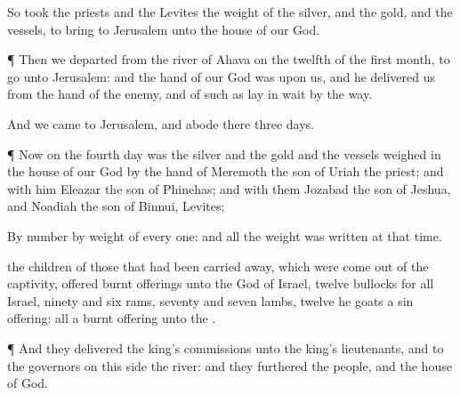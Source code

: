 {So
took the
priests and the
Levites the
weight of the
silver, and the
gold, and the
vessels, to
bring
{} to
Jerusalem unto the
house of our
God.


\par }{\PP {}¶ Then we
departed from the
river of
Ahava on the
twelfth
{} of the
first
month, to
go unto
Jerusalem: and the
hand of our
God was upon us, and he
delivered us from the
hand of the
enemy, and of such as lay in
wait by the
way.

And we
came to
Jerusalem, and
abode there
three
days.


\par }{\PP {}¶ Now on the
fourth
day was the
silver and the
gold and the
vessels
weighed in the
house of our
God by the
hand of
Meremoth the
son of
Uriah the
priest; and with him
{}
Eleazar the
son of
Phinehas; and with them
{}
Jozabad the
son of
Jeshua, and
Noadiah the
son of
Binnui,
Levites;

By
number
{} by
weight of every one: and all the
weight was
written at that
time.

 the
children of those that had been carried
away, which were come
out of the
captivity,
offered burnt
offerings unto the
God of
Israel,
twelve
bullocks for all
Israel,
ninety and
six
rams,
seventy and
seven
lambs,
twelve he
goats
{} a sin
offering: all
{} a burnt
offering unto the
{}.


\par }{\PP {}¶ And they
delivered the
king’s
commissions unto the
king’s
lieutenants, and to the
governors on this
side the
river: and they
furthered the
people, and the
house of
God.




\par }
